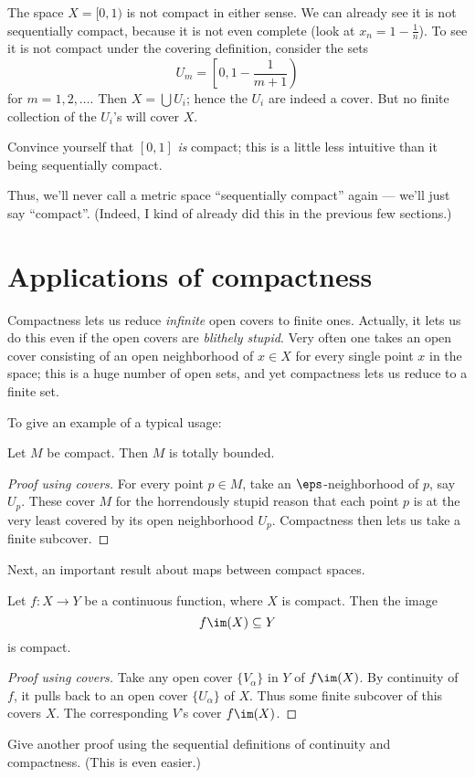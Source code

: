 \begin{example}
	The space $X = [0,1)$ is not compact in either sense. %
	We can already see it is not sequentially compact, because it is not even complete (look at $x_n = 1 - \frac 1n$).
	To see it is not compact under the covering definition, consider the sets
	\[ U_m = \left[0, 1 - \frac{1}{m+1} \right) \] %
	for $m = 1, 2, \dots$. Then $X = \bigcup U_i$; hence the $U_i$ are indeed a cover.
	But no finite collection of the $U_i$'s will cover $X$.
\end{example}
\begin{ques}
	Convince yourself that $[0,1]$ \emph{is} compact;
	this is a little less intuitive than it being sequentially compact.
\end{ques}
\begin{abuse}
	Thus, we'll never call a metric space ``sequentially compact'' again
	--- we'll just say ``compact''.
	(Indeed, I kind of already did this in the previous few sections.)
\end{abuse}


\section{Applications of compactness}
Compactness lets us reduce \emph{infinite} open covers to finite ones.
Actually, it lets us do this even if the open covers are \emph{blithely stupid}.
Very often one takes an open cover consisting
of an open neighborhood of $x \in X$ for every single point $x$ in the space;
this is a huge number of open sets,
and yet compactness lets us reduce to a finite set.

To give an example of a typical usage:
\begin{proposition}
	Let $M$ be compact. Then $M$ is totally bounded.
\end{proposition}
\begin{proof}[Proof using covers]
	For every point $p \in M$, take an $\eps$-neighborhood of $p$, say $U_p$.
	These cover $M$ for the horrendously stupid reason that each point $p$ is
	at the very least covered by its open neighborhood $U_p$.
	Compactness then lets us take a finite subcover.
\end{proof}

Next, an important result about maps between compact spaces.
\begin{theorem}
	Let $f \colon X \to Y$ be a continuous function, where $X$ is compact.
	Then the image \[ f\im(X) \subseteq Y \] is compact.
\end{theorem}
\begin{proof}[Proof using covers]
	Take any open cover $\{V_\alpha\}$ in $Y$ of $f\im(X)$.
	By continuity of $f$,
	it pulls back to an open cover $\{U_\alpha\}$ of $X$.
	Thus some finite subcover of this covers $X$.
	The corresponding $V$'s cover $f\im(X)$.
\end{proof}
\begin{ques}
	Give another proof using the sequential definitions
	of continuity and compactness.
	(This is even easier.)
\end{ques}

